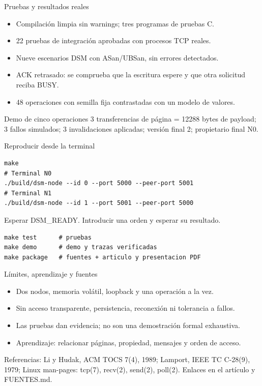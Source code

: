 \documentclass[aspectratio=169]{beamer}
\begin{document}
\begin{frame}{Pruebas y resultados reales}
\begin{itemize}
\item Compilación limpia sin warnings; tres programas de pruebas C.
\item 22 pruebas de integración aprobadas con procesos TCP reales.
\item Nueve escenarios DSM con ASan/UBSan, sin errores detectados.
\item ACK retrasado: se comprueba que la escritura espere y que otra solicitud reciba BUSY.
\item 48 operaciones con semilla fija contrastadas con un modelo de valores.
\end{itemize}
\begin{block}{Demo de cinco operaciones}
3 transferencias de página = 12288 bytes de payload; 3 fallos simulados;
3 invalidaciones aplicadas; versión final 2; propietario final N0.
\end{block}
\end{frame}

\begin{frame}[fragile]{Reproducir desde la terminal}
\begin{verbatim}
make
# Terminal N0
./build/dsm-node --id 0 --port 5000 --peer-port 5001
# Terminal N1
./build/dsm-node --id 1 --port 5001 --peer-port 5000
\end{verbatim}
Esperar DSM\_READY. Introducir una orden y esperar su resultado.
\begin{verbatim}
make test      # pruebas
make demo      # demo y trazas verificadas
make package   # fuentes + articulo y presentacion PDF
\end{verbatim}
\end{frame}

\begin{frame}{Límites, aprendizaje y fuentes}
\begin{itemize}
\item Dos nodos, memoria volátil, loopback y una operación a la vez.
\item Sin acceso transparente, persistencia, reconexión ni tolerancia a fallos.
\item Las pruebas dan evidencia; no son una demostración formal exhaustiva.
\item Aprendizaje: relacionar páginas, propiedad, mensajes y orden de acceso.
\end{itemize}
\small Referencias: Li y Hudak, ACM TOCS 7(4), 1989; Lamport, IEEE TC C-28(9), 1979;
Linux man-pages: tcp(7), recv(2), send(2), poll(2). Enlaces en el artículo y FUENTES.md.
\end{frame}
\end{document}
